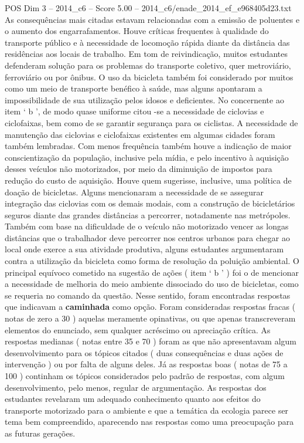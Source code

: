 \begin{textsample}{POS Dim 3 – 2014\_c6 – Score 5.00 – 2014\_c6/enade\_2014\_ef\_e968405d23.txt}
As consequências mais citadas estavam relacionadas com a emissão de poluentes e o aumento dos engarrafamentos.
Houve críticas frequentes à qualidade do transporte público e à necessidade de locomoção rápida diante da distância das residências aos locais de trabalho.
Em tom de reivindicação, muitos estudantes defenderam solução para os problemas do transporte coletivo, quer metroviário, ferroviário ou por ônibus.
O uso da bicicleta também foi considerado por muitos como um meio de transporte benéfico à saúde, mas alguns apontaram a impossibilidade de sua utilização pelos idosos e deficientes.
No concernente ao item ‘ b ’, de modo quase uniforme citou -se a necessidade de ciclovias e ciclofaixas, bem como de se garantir segurança para os ciclistas.
A necessidade de manutenção das ciclovias e ciclofaixas existentes em algumas cidades foram também lembradas.
Com menos frequência também houve a indicação de maior conscientização da população, inclusive pela mídia, e pelo incentivo à aquisição desses veículos não motorizados, por meio da diminuição de impostos para redução do custo de aquisição.
Houve quem sugerisse, inclusive, uma política de doação de bicicletas.
Alguns mencionaram a necessidade de se assegurar integração das ciclovias com os demais modais, com a construção de bicicletários seguros diante das grandes distâncias a percorrer, notadamente nas metrópoles.
Também com base na dificuldade de o veículo não motorizado vencer as longas distâncias que o trabalhador deve percorrer nos centros urbanos para chegar ao local onde exerce a sua atividade produtiva, alguns estudantes argumentaram contra a utilização da bicicleta como forma de resolução da poluição ambiental.
O principal equívoco cometido na sugestão de ações ( item ‘ b ’ ) foi o de mencionar a necessidade de melhoria do meio ambiente dissociado do uso de bicicletas, como se requeria no comando da questão.
Nesse sentido, foram encontradas respostas que indicavam a \textbf{caminhada} como opção.
Foram consideradas respostas fracas ( notas de zero a 30 ) aquelas meramente opinativas, ou que apenas transcreveram elementos do enunciado, sem qualquer acréscimo ou apreciação crítica.
As respostas medianas ( notas entre 35 e 70 ) foram as que não apresentavam algum desenvolvimento para os tópicos citados ( duas consequências e duas ações de intervenção ) ou por falta de alguns deles.
Já as respostas boas ( notas de 75 a 100 ) continham os tópicos considerados pelo padrão de respostas, com algum desenvolvimento, pelo menos, regular de argumentação.
As respostas dos estudantes revelaram um adequado conhecimento quanto aos efeitos do transporte motorizado para o ambiente e que a temática da ecologia parece ser tema bem compreendido, aparecendo nas respostas como uma preocupação para as futuras gerações.

\end{textsample}
